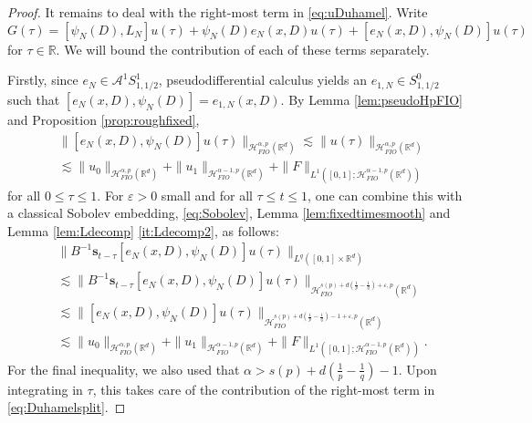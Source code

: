 \documentclass{amsart}
\numberwithin{equation}{section}
\theoremstyle{definition}
\newcommand{\R}{\mathbb{R}}
\newcommand{\Rd}{\mathbb{R}^{d}}
\newcommand{\Rn}{\mathbb{R}^{d}}
\newcommand {\A}{\mathcal{A}}
\newcommand {\HT}{\mathcal{H}}
\newcommand {\veps}{\varepsilon}
\newcommand {\sn}{\mathbf{s}}
\begin{document}
\begin{proof}
It remains to deal with the right-most term in \eqref{eq:uDuhamel}. Write
\begin{equation}\label{eq:Duhamelsplit}
G(\tau)=[\psi_{N}(D),L_{N}]u(\tau)+\psi_{N}(D)e_{N}(x,D)u(\tau)+[e_{N}(x,D),\psi_{N}(D)]u(\tau)
\end{equation}
for $\tau\in\R$. We will bound the contribution of each of these terms separately.

Firstly, since $e_{N}\in \A^{1}S^{1}_{1,1/2}$, pseudodifferential calculus yields an $e_{1,N}\in S^{0}_{1,1/2}$ such that $[e_{N}(x,D),\psi_{N}(D)]=e_{1,N}(x,D)$. By Lemma \ref{lem:pseudoHpFIO} and Proposition \ref{prop:roughfixed},
\begin{align*}
&\|[e_{N}(x,D),\psi_{N}(D)]u(\tau)\|_{\HT^{\alpha,p}_{FIO}(\Rd)}\lesssim \|u(\tau)\|_{\HT^{\alpha,p}_{FIO}(\Rd)}\\
&\lesssim \|u_{0}\|_{\HT^{\alpha,p}_{FIO}(\R^d)}+\|u_{1}\|_{\HT^{\alpha-1,p}_{FIO}(\R^d)}+\|F\|_{L^{1}([0,1];\HT^{\alpha-1,p}_{FIO}(\R^d))}
\end{align*}
for all $0\leq \tau\leq 1$. For $\veps>0$ small and for all $\tau\leq t\leq 1$, one can combine this with a classical Sobolev embedding, \eqref{eq:Sobolev}, Lemma \ref{lem:fixedtimesmooth} and Lemma \ref{lem:Ldecomp} \eqref{it:Ldecomp2}, as follows:
\begin{align*}
&\big\|B^{-1}\sn_{t-\tau}[e_{N}(x,D),\psi_{N}(D)]u(\tau)\big\|_{L^{q}([0,1]\times\Rd)}\\
&\lesssim \big\|B^{-1}\sn_{t-\tau}[e_{N}(x,D),\psi_{N}(D)]u(\tau)\big\|_{\HT^{s(p)+d(\frac{1}{p}-\frac{1}{q})+\veps,p}_{FIO}(\Rn)}\\
&\lesssim \big\|[e_{N}(x,D),\psi_{N}(D)]u(\tau)\big\|_{\HT^{s(p)+d(\frac{1}{p}-\frac{1}{q})-1+\veps,p}_{FIO}(\Rn)}\\
&\lesssim \|u_{0}\|_{\HT^{\alpha,p}_{FIO}(\R^d)}+\|u_{1}\|_{\HT^{\alpha-1,p}_{FIO}(\R^d)}+\|F\|_{L^{1}([0,1];\HT^{\alpha-1,p}_{FIO}(\R^d))}.
\end{align*}
For the final inequality, we also used that $\alpha>s(p)+d(\frac{1}{p}-\frac{1}{q})-1$. Upon integrating in $\tau$, this takes care of the contribution of the right-most term in \eqref{eq:Duhamelsplit}.


\end{proof}
\end{document}
